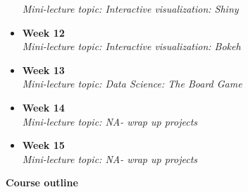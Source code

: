 \documentclass[11pt,letter]{article}
\begin{document}
\begin{itemize}[nosep]
      \textit{Mini-lecture topic: Interactive visualization: Shiny}
  \item \textbf{Week 12}\\
      \textit{Mini-lecture topic: Interactive visualization: Bokeh}
  \item \textbf{Week 13}\\
      \textit{Mini-lecture topic: Data Science: The Board Game}
  \item \textbf{Week 14}\\
      \textit{Mini-lecture topic: NA- wrap up projects}
  \item \textbf{Week 15}\\
      \textit{Mini-lecture topic: NA- wrap up projects}
\end{itemize}
\fi

\hspace{-1.3cm}\textbf{Course outline}\\[3mm]
\end{document}
